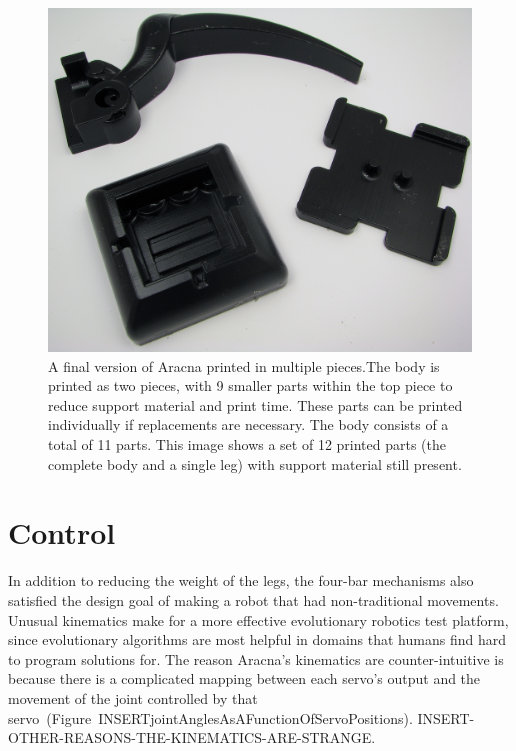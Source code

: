 \documentclass[letterpaper]{article}
\begin{document}
\begin{figure}[t]
\begin{center}
\includegraphics[width=.37\textwidth]{fig6.jpg}
\caption{A final version of Aracna printed in multiple pieces.The body is printed as two pieces, with 9 smaller parts within the top piece to reduce support material and print time. These parts can be printed individually if replacements are necessary. The body consists of a total of 11 parts. This image shows a set of 12 printed parts (the complete body and a single leg) with support material still present.}
\label{notYetCleanedMulitPieceRobot}
\end{center}
\end{figure}


\begin{table}[h]
\vskip 0.25cm
\caption{Estimated total cost. The cost of components and printing material reflect market prices from March 2012. A complete parts list is on our website \citep{WEB}.}
\label{tab:cost}
\end{table}


\section{Control}

In addition to reducing the weight of the legs, the four-bar
mechanisms also satisfied the design goal of making a robot that had
non-traditional movements. Unusual kinematics make for a more effective evolutionary robotics test platform, since evolutionary algorithms are most helpful in domains that humans find hard to program solutions for. The reason Aracna's kinematics are counter-intuitive is because there is a complicated mapping between each servo's output and the movement of the joint controlled by that servo~(Figure~INSERTjointAnglesAsAFunctionOfServoPositions). INSERT-OTHER-REASONS-THE-KINEMATICS-ARE-STRANGE. 
\end{document}

